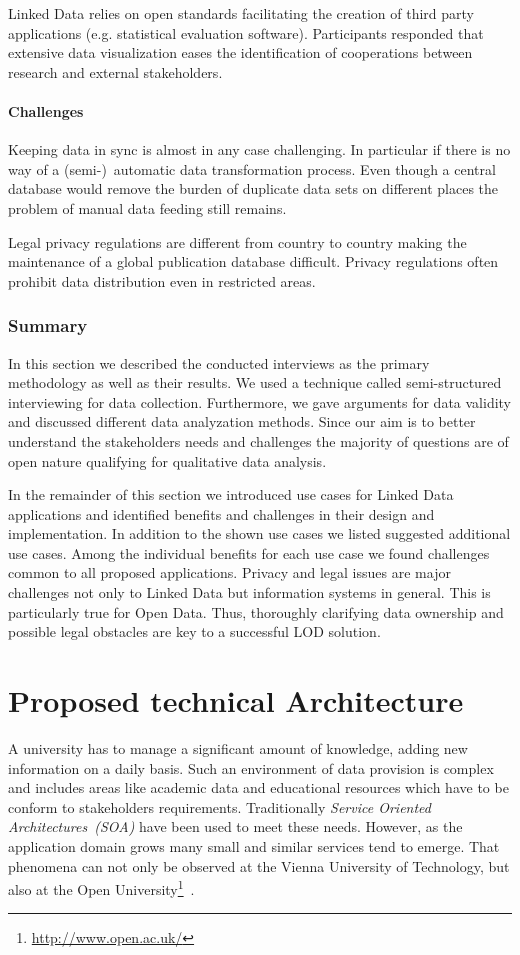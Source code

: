 \documentclass{article}
\begin{document}
Linked Data relies on open standards facilitating the creation of third party applications (e.g. statistical evaluation software). Participants responded that extensive data visualization eases the identification of cooperations between research and external stakeholders. 
\paragraph{Challenges}
Keeping data in sync is almost in any case challenging. In particular if there is no way of a (semi-)~automatic data transformation process. Even though a central database would remove the burden of duplicate data sets on different places the problem of manual data feeding still remains. 

Legal privacy regulations are different from country to country making the maintenance of a global publication database difficult. Privacy regulations often prohibit data distribution even in restricted areas. 
\subsubsection{Summary}
In this section we described the conducted interviews as the primary methodology as well as their results. We used a technique called semi-structured interviewing for data collection. Furthermore, we gave arguments for data validity and discussed different data analyzation methods. Since our aim is to better understand the stakeholders needs and challenges the majority of questions are of open nature qualifying for qualitative data analysis. 

In the remainder of this section we introduced use cases for Linked Data applications and identified benefits and challenges in their design and implementation. In addition to the shown use cases we listed suggested additional use cases. Among the individual benefits for each use case we found challenges common to all proposed applications. Privacy and legal issues are major challenges not only to Linked Data but information systems in general. This is particularly true for Open Data. Thus, thoroughly clarifying data ownership and possible legal obstacles are key to a successful LOD solution.  

\section{Proposed technical Architecture}
\label{sec:technical_architecture}
A university has to manage a significant amount of knowledge, adding new information on a daily basis.
Such an environment of data provision is complex and includes areas like academic data and educational resources which have to be conform to stakeholders requirements. Traditionally \textit{Service Oriented Architectures~(SOA)} have been used to meet these needs. However, as the application domain grows many small and similar services tend to emerge. That phenomena can not only be observed at the Vienna University of Technology, but also at the Open University\footnote{\url{http://www.open.ac.uk/}}~\cite{inproceedings:zablith_consuming_2011}.
\end{document}
